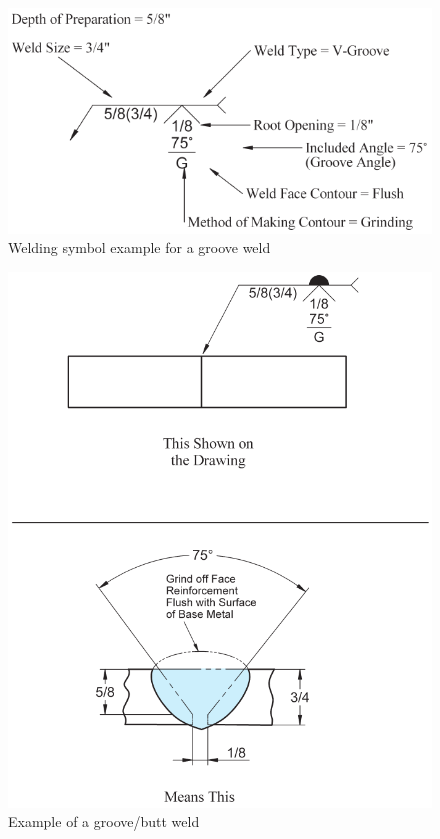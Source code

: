 \begin{figure}[H]
\centering
\includegraphics{PIC/CH07/EXAMPLE/BW}
\caption{Welding symbol example for a groove weld \citep{Corgan2017}}
\end{figure}
\begin{figure}[H]
\centering
\includegraphics{PIC/CH07/EXAMPLE/BW2}
\caption{Example of a groove/butt weld \citep{Corgan2017}}
\end{figure}
